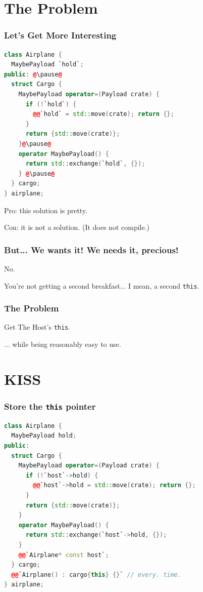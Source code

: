 \documentclass{beamer}
\def\code#1{\texttt{#1}}
\newcommand{\this}{\code{this}\xspace}
\newcommand{\nl}{\vspace{0.2\baselineskip}}
\begin{document}
\section{The Problem}

\begin{frame}[fragile]
  \frametitle{Let's Get More Interesting}
\begin{lstlisting}[language=cpp]
class Airplane {
  MaybePayload `hold`;
public: @\pause@
  struct Cargo {
    MaybePayload operator=(Payload crate) {
      if (!`hold`) {
        @@`hold` = std::move(crate); return {};
      }
      return {std::move(crate)};
    }@\pause@
    operator MaybePayload() {
      return std::exchange(`hold`, {});
    } @\pause@
  } cargo;
} airplane;
\end{lstlisting}
\pause
Pro: this solution is pretty.
\pause

Con: it is not a solution. {\tiny (It does not compile.)}
\end{frame}

\begin{frame}[fragile]
  \frametitle{But... We wants it! We needs it, precious!}

\begin{center}
  {\Huge No.}
  \vspace{.8 in} 

  You're not getting a second breakfast... I mean, a second \this.
\end{center}
\end{frame}


\begin{frame}
  \frametitle{The Problem}

\begin{center}
  {\Huge Get The Host's \this.} \nl

  ... while being reasonably easy to use.
\end{center}
\end{frame}


\section{KISS}

\begin{frame}[fragile]
  \frametitle{Store the \this pointer}
  \begin{lstlisting}[language=cpp]
class Airplane {
  MaybePayload hold;
public:
  struct Cargo {
    MaybePayload operator=(Payload crate) {
      if (!`host`->hold) {
        @@`host`->hold = std::move(crate); return {};
      }
      return {std::move(crate)};
    }
    operator MaybePayload() {
      return std::exchange(`host`->hold, {});
    }
    @@`Airplane* const host`;
  } cargo;
  @@`Airplane() : cargo{this} {}` // every. time.
} airplane;
  \end{lstlisting}
\end{frame}
\end{document}
